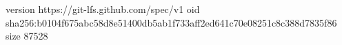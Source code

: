 version https://git-lfs.github.com/spec/v1
oid sha256:b0104f675abc58d8e51400db5ab1f733aff2ed641c70e08251c8c388d7835f86
size 87528
